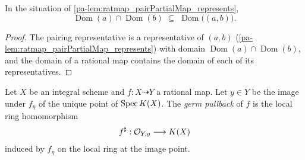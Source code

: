 \begin{lemma}
  \label{pa-lem:ratmap_le_domain_prod}
  \leanok

  In the situation of \ref{pa-lem:ratmap_pairPartialMap_represents},
  \[
    \operatorname{Dom}(a) \cap \operatorname{Dom}(b)
    \;\subseteq\; \operatorname{Dom}\bigl((a,b)\bigr).
  \]
\end{lemma}
\begin{proof}
  \leanok
  The pairing representative is a representative of \((a, b)\)
  (\ref{pa-lem:ratmap_pairPartialMap_represents}) with domain
  \(\operatorname{Dom}(a) \cap \operatorname{Dom}(b)\), and the domain of a
  rational map contains the domain of each of its representatives.
\end{proof}

\begin{definition}
  \label{pa-def:ratmap_stalkPullback}
  \leanok

  Let \(X\) be an integral scheme and \(f : X \dashrightarrow Y\) a rational
  map. Let \(y \in Y\) be the image under \(f_\eta\) of the unique point of
  \(\operatorname{Spec} K(X)\). The \emph{germ pullback} of \(f\) is the local ring
  homomorphism
  \[
    f^\sharp : \mathcal{O}_{Y, y} \longrightarrow K(X)
  \]
  induced by \(f_\eta\) on the local ring at the image point.
\end{definition}

